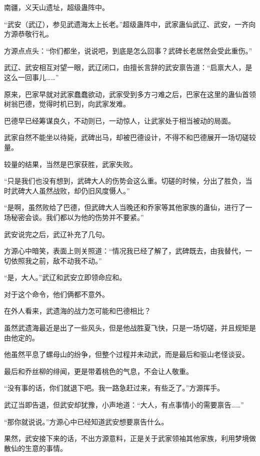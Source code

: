
\begin{this_body}

南疆，义天山遗址，超级蛊阵中。

“武安（武辽），参见武遗海太上长老。”超级蛊阵中，武家蛊仙武辽、武安，一齐向方源恭敬行礼。

方源点点头：“你们都坐，说说吧，到底是怎么回事？武碑长老居然会受此重伤。”

武辽、武安相互对望一眼，武辽闭口，由擅长言辞的武安禀告道：“启禀大人，是这么一回事儿……”

原来，巴家早就对武家蠢蠢欲动，武家受到多方刁难之后，巴家在这里的蛊仙首领树翁巴德，觉得时机已到，向武家发难。

巴德早已经筹谋良久，不动则已，一动惊人，让武家处于相当被动的局面。

武家自然不能坐以待毙，武碑出马，却被巴德设计，不得不和巴德展开一场切磋较量。

较量的结果，当然是巴家获胜，武家失败。

“只是我们也没有想到，武碑大人的伤势会这么重。切磋的时候，分出了胜负，当时武碑大人虽然战败，却仍旧风度慑人。”

“是啊，虽然败给了巴德，但武碑大人当晚还和乔家等其他家族的蛊仙，进行了一场秘密会谈。我们都以为他的伤势并不要紧。”

武安说完之后，武辽补充了几句。

方源心中暗笑，表面上则关照道：“情况我已经了解了，武碑既去，由我替代，一切依照我之前，敌不动我不动。”

“是，大人。”武辽和武安立即领命应和。

对于这个命令，他们俩都不意外。

在外人看来，武遗海的战力怎可能和巴德相比？

虽然武遗海最近是出了一些风头，但是他战胜夏飞快，只是一场切磋，并且规矩是由他定的。

他虽然平息了螺母山的纷争，但整个过程并未动武，而是最后和驱山老怪谈妥。

最后和乔丝柳的绯闻，更是带着桃色的气息，不会让人敬重。

“没有事的话，你们就退下吧。我一路急赶过来，有些乏了。”方源挥手。

武辽当即告退，但武安却犹豫，小声地道：“大人，有点事情小的需要禀告……”

“那你就说说。”方源心中已经知道武安想要禀告什么。

果然，武安接下来的话，不出方源意料，正是关于武家领袖其他家族，利用梦境做散仙的生意的事情。


\end{this_body}
